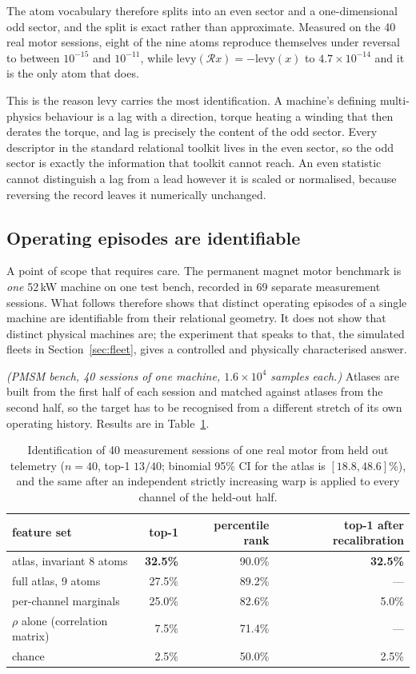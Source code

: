 \documentclass[11pt]{article}
\newcommand{\levy}{\mathrm{levy}}
\begin{document}
The atom vocabulary therefore splits into an even sector and a one-dimensional
odd sector, and the split is exact rather than approximate. Measured on the 40
real motor sessions, eight of the nine atoms reproduce themselves under
reversal to between $10^{-15}$ and $10^{-11}$, while
$\levy(\mathcal{R}x) = -\levy(x)$ to $4.7\times10^{-14}$ and it is the only
atom that does.

This is the reason $\levy$ carries the most identification. A machine's
defining multi-physics behaviour is a lag with a direction, torque heating a
winding that then derates the torque, and lag is precisely the content of the
odd sector. Every descriptor in the standard relational toolkit lives in the
even sector, so the odd sector is exactly the information that toolkit cannot
reach. An even statistic cannot distinguish a lag from a lead however it is
scaled or normalised, because reversing the record leaves it numerically
unchanged.

\subsection{Operating episodes are identifiable}A point of scope that requires care. The permanent magnet motor benchmark is \emph{one} 52\,kW
machine on one test bench, recorded in 69 separate measurement sessions. What
follows therefore shows that distinct operating episodes of a single machine
are identifiable from their relational geometry. It does not show that
distinct physical machines are; the experiment that speaks to that, the
simulated fleets in Section~\ref{sec:fleet}, gives a controlled and physically characterised
answer.

\emph{(PMSM bench, 40 sessions of one machine, $1.6\times10^4$ samples each.)}
Atlases are built from the first half of each session and matched against
atlases from the second half, so the target has to be recognised from a
different stretch of its own operating history. Results are in
Table~\ref{tab:fp}.

\begin{table}[t]
\centering
\begin{tabular}{lrrr}
\toprule
feature set & top-1 & percentile rank & top-1 after recalibration \\
\midrule
atlas, invariant 8 atoms  & \textbf{32.5\%} & 90.0\% & \textbf{32.5\%} \\
full atlas, 9 atoms       & 27.5\% & 89.2\% & --- \\
per-channel marginals     & 25.0\% & 82.6\% & 5.0\% \\
$\rho$ alone (correlation matrix) & 7.5\% & 71.4\% & --- \\
chance                    & 2.5\%  & 50.0\% & 2.5\% \\
\bottomrule
\end{tabular}
\caption{Identification of 40 measurement sessions of one real motor from held
out telemetry ($n=40$, top-1 $13/40$; binomial 95\% CI for the atlas is
$[18.8, 48.6]\%$), and the same after an independent strictly increasing warp
is applied to every channel of the held-out half.}
\label{tab:fp}
\end{table}
\end{document}

